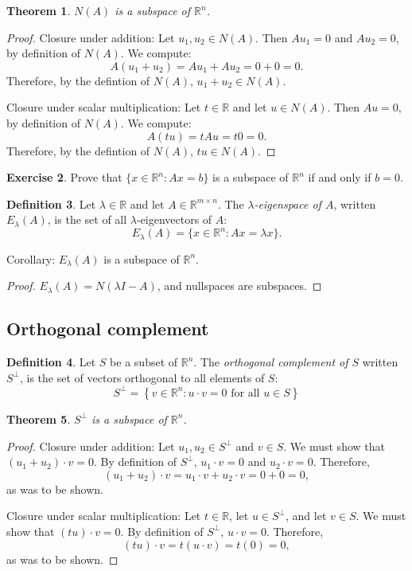 \documentclass[fullpage]{amsart}
\newcommand{\RR}{\mathbb{R}}
\newtheorem{theorem}{Theorem}[section]
\theoremstyle{definition}
\newtheorem{definition}[theorem]{Definition}
\newtheorem{exercise}[theorem]{Exercise}
\begin{document}
\begin{theorem}
  $N(A)$ is a subspace of $\RR^n$.
\end{theorem}

\begin{proof}
  Closure under addition: Let $u_1, u_2\in N(A)$. Then $Au_1=0$ and $Au_2=0$, by definition of $N(A)$. We compute:
  \[
    A(u_1+u_2)=Au_1 + Au_2 = 0 + 0 = 0.
  \]
  Therefore, by the defintion of $N(A)$, $u_1+u_2\in N(A)$.

  Closure under scalar multiplication: Let $t\in \RR$ and let $u\in N(A)$.
  Then $Au=0$, by definition of $N(A)$. We compute:
  \[
    A(tu)=tAu  = t0 = 0.
  \]
  Therefore, by the defintion of $N(A)$, $tu\in N(A)$.
\end{proof}

\begin{exercise}
Prove that $\{x\in\RR^n : Ax=b\}$ is a subspace of $\RR^n$ if and only if $b=0$.
\end{exercise}

\begin{definition}
  Let $\lambda\in \RR$ and let $A\in\RR^{m\times n}$.
  The \emph{$\lambda$-eigenspace of $A$}, written  $E_\lambda(A)$, is the set of all $\lambda$-eigenvectors of $A$:
  $$E_\lambda(A) = \{x\in\RR^n: Ax = \lambda x\}.$$
\end{definition}

Corollary: $E_\lambda(A)$ is a subspace of $\RR^n$.

\begin{proof}
  $E_\lambda(A) = N(\lambda I - A)$, and nullspaces are subspaces.
\end{proof}

\subsection{Orthogonal complement}
\begin{definition}
  Let $S$ be a subset of $\RR^n$.
The \emph{orthogonal complement of $S$} written $S^\perp$, is the set of vectors orthogonal to all elements of $S$:
$$S^\perp = \left\{v\in\RR^n : \text{$u\cdot v = 0$ for all $u\in S$}
\right\}$$
\end{definition}

\begin{theorem}
  $S^\perp$ is a subspace of $\RR^n$.
\end{theorem}

\begin{proof}
  Closure under addition: Let $u_1, u_2\in S^\perp$ and $v\in S$.
  We must show that $(u_1+u_2)\cdot v=0$.
  By definition of $S^\perp$, $u_1\cdot v=0$ and $u_2\cdot v = 0$.
  Therefore,
    \[
    (u_1+u_2)\cdot v=u_1\cdot v + u_2\cdot v = 0 + 0 = 0,
  \]
  as was to be shown.

  Closure under scalar multiplication: Let $t\in \RR$, let $u\in S^\perp$, and let $v\in S$.
  We must show that $(tu)\cdot v=0$. By definition of $S^\perp$, $u\cdot v = 0$.
  Therefore,
  \[
    (tu)\cdot v=t (u\cdot v)  = t(0) = 0,
  \]
  as was to be shown.

\end{proof}
\end{document}

